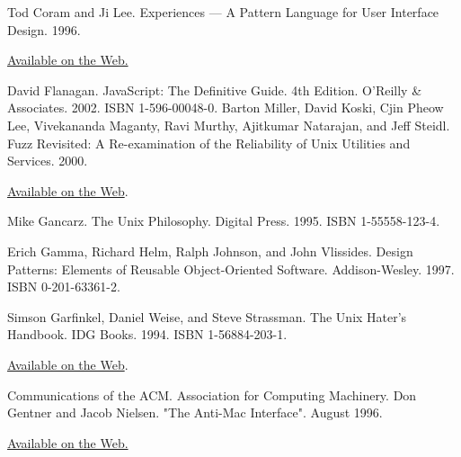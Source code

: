 \documentclass[12pt,oneside]{book}
\begin{document}
\begin{common-format}
\begin{thebibliography}{9}
 Tod Coram and Ji Lee. Experiences — A Pattern Language for User Interface Design. 1996.

\href{http://www.maplefish.com/todd/papers/Experiences.html}{Available on the Web.}

%
%
%
%
%
 David Flanagan. JavaScript: The Definitive Guide. 4th Edition. O'Reilly \&{} Associates. 2002. ISBN 1-596-00048-0.
%
%
%
 Barton Miller, David Koski, Cjin Pheow Lee, Vivekananda Maganty, Ravi Murthy, Ajitkumar Natarajan, and Jeff Steidl. Fuzz Revisited: A Re-examination of the Reliability of Unix Utilities and Services. 2000.

\href{http://www.opensource.org/advocacy/fuzz-revisited.pdf}{Available on the Web}.

%
%
 Mike Gancarz. The Unix Philosophy. Digital Press. 1995. ISBN 1-55558-123-4.

 Erich Gamma, Richard Helm, Ralph Johnson, and John Vlissides. Design Patterns: Elements of Reusable Object-Oriented Software. Addison-Wesley. 1997. ISBN 0-201-63361-2.

 Simson Garfinkel, Daniel Weise, and Steve Strassman. The Unix Hater's Handbook. IDG Books. 1994. ISBN 1-56884-203-1.

\href{http://research.microsoft.com/~daniel/unix-haters.html}{Available on the Web}.

 Communications of the ACM. Association for Computing Machinery. Don Gentner and Jacob Nielsen. "The Anti-Mac Interface". August 1996.

\href{http://www.acm.org/cacm/AUG96/antimac.htm}{Available on the Web.}


\end{thebibliography}
\end{common-format}
\end{document}
